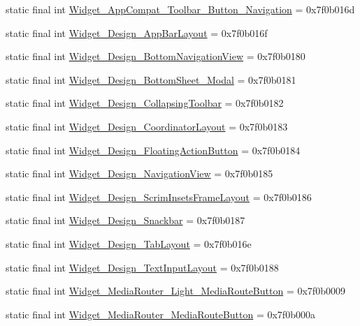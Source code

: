 \begin{CompactItemize}
\item 
static final int \hyperlink{classandroid_1_1support_1_1coreutils_1_1_r_1_1style_ff9050d5db5ae71df573d0667a261d8f}{Widget\_\-AppCompat\_\-Toolbar\_\-Button\_\-Navigation} = 0x7f0b016d
\item 
static final int \hyperlink{classandroid_1_1support_1_1coreutils_1_1_r_1_1style_283bdbf947806e6a31b9a2d631b319ad}{Widget\_\-Design\_\-AppBarLayout} = 0x7f0b016f
\item 
static final int \hyperlink{classandroid_1_1support_1_1coreutils_1_1_r_1_1style_113be7bf766953ca3fa53e95dfa0091c}{Widget\_\-Design\_\-BottomNavigationView} = 0x7f0b0180
\item 
static final int \hyperlink{classandroid_1_1support_1_1coreutils_1_1_r_1_1style_31dcb3e89c3ba2cbad7f0735d2d54227}{Widget\_\-Design\_\-BottomSheet\_\-Modal} = 0x7f0b0181
\item 
static final int \hyperlink{classandroid_1_1support_1_1coreutils_1_1_r_1_1style_2b187865013ef753b6ed76f630791b24}{Widget\_\-Design\_\-CollapsingToolbar} = 0x7f0b0182
\item 
static final int \hyperlink{classandroid_1_1support_1_1coreutils_1_1_r_1_1style_ff716eb6c53246d1740ee25d027093dd}{Widget\_\-Design\_\-CoordinatorLayout} = 0x7f0b0183
\item 
static final int \hyperlink{classandroid_1_1support_1_1coreutils_1_1_r_1_1style_57b90b68841efb68d301324799d5af3e}{Widget\_\-Design\_\-FloatingActionButton} = 0x7f0b0184
\item 
static final int \hyperlink{classandroid_1_1support_1_1coreutils_1_1_r_1_1style_ec3bc9eaeaf0648e92a6a04ce440bff0}{Widget\_\-Design\_\-NavigationView} = 0x7f0b0185
\item 
static final int \hyperlink{classandroid_1_1support_1_1coreutils_1_1_r_1_1style_ae7c031aacb4a1ed17153646062deeef}{Widget\_\-Design\_\-ScrimInsetsFrameLayout} = 0x7f0b0186
\item 
static final int \hyperlink{classandroid_1_1support_1_1coreutils_1_1_r_1_1style_7d4b7ab2f0d9a1ab482e0df70f3da0eb}{Widget\_\-Design\_\-Snackbar} = 0x7f0b0187
\item 
static final int \hyperlink{classandroid_1_1support_1_1coreutils_1_1_r_1_1style_b00cf42f410429d5d2a57c8afc82c8ac}{Widget\_\-Design\_\-TabLayout} = 0x7f0b016e
\item 
static final int \hyperlink{classandroid_1_1support_1_1coreutils_1_1_r_1_1style_018094a407d38efdc05e8187658105c5}{Widget\_\-Design\_\-TextInputLayout} = 0x7f0b0188
\item 
static final int \hyperlink{classandroid_1_1support_1_1coreutils_1_1_r_1_1style_90c9239117b9fa0357f008ae8aab9684}{Widget\_\-MediaRouter\_\-Light\_\-MediaRouteButton} = 0x7f0b0009
\item 
static final int \hyperlink{classandroid_1_1support_1_1coreutils_1_1_r_1_1style_24dcb6218a56d1666e1844766e5b8180}{Widget\_\-MediaRouter\_\-MediaRouteButton} = 0x7f0b000a
\end{CompactItemize}


